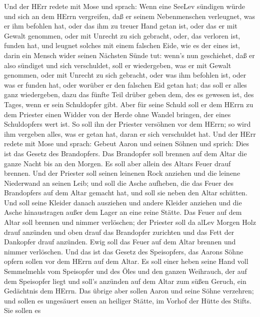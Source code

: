  Und der HErr redete mit Mose und sprach:  Wenn
eine SeeLev sündigen würde und sich an dem HErrn vergreifen, daß er
seinem Nebenmenschen verleugnet, was er ihm befohlen hat, oder das ihm
zu treuer Hand getan ist, oder das er mit Gewalt genommen, oder mit
Unrecht zu sich gebracht,  oder, das verloren ist, funden
hat, und leugnet solches mit einem falschen Eide, wie es der eines ist,
darin ein Mensch wider seinen Nächsten Sünde tut:  wenn's
nun geschiehet, daß er also sündiget und sich verschuldet, soll er
wiedergeben, was er mit Gewalt genommen, oder mit Unrecht zu sich
gebracht, oder was ihm befohlen ist, oder was er funden hat,
 oder worüber er den falschen Eid getan hat; das soll er
alles ganz wiedergeben, dazu das fünfte Teil drüber geben dem, des es
gewesen ist, des Tages, wenn er sein Schuldopfer gibt.  Aber
für seine Schuld soll er dem HErrn zu dem Priester einen Widder von der
Herde ohne Wandel bringen, der eines Schuldopfers wert ist. 
So soll ihn der Priester versöhnen vor dem HErrn; so wird ihm vergeben
alles, was er getan hat, daran er sich verschuldet hat.  Und
der HErr redete mit Mose und sprach:  Gebeut Aaron und
seinen Söhnen und sprich: Dies ist das Gesetz des Brandopfers. Das
Brandopfer soll brennen auf dem Altar die ganze Nacht bis an den Morgen.
Es soll aber allein des Altars Feuer drauf brennen.  Und
der Priester soll seinen leinenen Rock anziehen und die leinene
Niederwand an seinen Leib; und soll die Asche aufheben, die das Feuer
des Brandopfers auf dem Altar gemacht hat, und soll sie neben den Altar
schütten.  Und soll seine Kleider danach ausziehen und
andere Kleider anziehen und die Asche hinaustragen außer dem Lager an
eine reine Stätte.  Das Feuer auf dem Altar soll brennen
und nimmer verlöschen; der Priester soll da alLev Morgen Holz drauf
anzünden und oben drauf das Brandopfer zurichten und das Fett der
Dankopfer drauf anzünden.  Ewig soll das Feuer auf dem
Altar brennen und nimmer verlöschen.  Und das ist das
Gesetz des Speisopfers, das Aarons Söhne opfern sollen vor dem HErrn auf
dem Altar.  Es soll einer heben seine Hand voll Semmelmehls
vom Speisopfer und des Öles und den ganzen Weihrauch, der auf dem
Speisopfer liegt und soll's anzünden auf dem Altar zum süßen Geruch, ein
Gedächtnis dem HErrn.  Das übrige aber sollen Aaron und
seine Söhne verzehren; und sollen es ungesäuert essen an heiliger
Stätte, im Vorhof der Hütte des Stifts.  Sie sollen es
